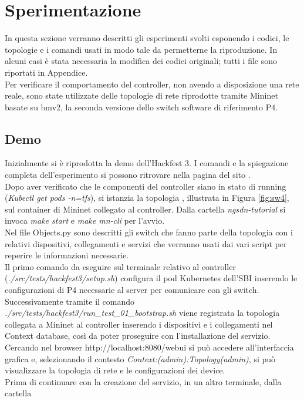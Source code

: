\section{Sperimentazione}
In questa sezione verranno descritti gli esperimenti svolti esponendo i codici, le topologie e i comandi usati 
in modo tale da permetterne la riproduzione. In alcuni casi è stata necessaria la modifica dei codici originali; tutti i file sono riportati in Appendice.
\\Per verificare il comportamento del controller, non avendo a disposizione una rete reale, sono state utilizzate delle topologie
di rete riprodotte tramite Mininet basate su bmv2\cite{bmv2}, la seconda versione dello switch software di riferimento P4.
\subsection{Demo}
Inizialmente si è riprodotta la demo dell'Hackfest 3. 
I comandi e la spiegazione completa dell'esperimento si possono ritrovare nella pagina del sito \cite{hackfest}.
\\Dopo aver verificato che le componenti del controller siano in stato di running (\textit{Kubectl get pods -n=tfs}),
si istanzia la topologia \cite{topo4}, illustrata in Figura \ref{fig:sw4}, sul container di Mininet collegato al controller.
Dalla cartella \textit{ngsdn-tutorial} si invoca \textit{make start} e \textit{make mn-cli} per l'avvio.
\\Nel file Objects.py sono descritti gli switch che fanno parte della topologia con i relativi
dispositivi, collegamenti e servizi che verranno usati dai vari script per reperire le informazioni necessarie.
\\Il primo comando da eseguire sul terminale relativo al controller (\textit{./src/tests/hackfest3/setup.sh}) configura il pod Kubernetes dell'SBI
inserendo le configurazioni di P4 necessarie al server per comunicare con gli switch.
\\Successivamente tramite il comando \textit{./src/tests/hackfest3/run\_test\_01\_bootstrap.sh} viene registrata la topologia collegata a Mininet al controller
inserendo i dispositivi e i collegamenti nel Context database, così da poter proseguire con l'installazione del servizio.
\\Cercando nel browser http://localhost:8080/webui si può accedere all'interfaccia grafica e, selezionando il contesto \textit{Context:(admin):Topology(admin)},
si può visualizzare la topologia di rete e le configurazioni dei device.
\\Prima di continuare con la creazione del servizio, in un altro terminale, dalla cartella
